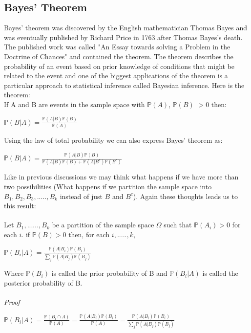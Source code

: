 \documentclass[,oneside]{article}
\begin{document}
\begin{enumerate}
\subsection{Bayes' Theorem}
Bayes' theorem was discovered by the English mathematician Thomas Bayes and was eventually published by Richard Price in 1763 after Thomas Bayes's death. The published work was called "An Essay towards solving a Problem in the Doctrine of Chances" and contained the theorem. The theorem describes the probability of an event based on prior knowledge of conditions that might be related to the event and one of the biggest applications of the theorem is a particular approach to statistical inference called Bayesian inference. Here is the theorem:\\
If A and B are events in the sample space with $\mathbb{P}(A)$, $\mathbb{P}(B)$ $> 0$ then:\\
\begin{center}
$\mathbb{P}(B|A)=\frac{\mathbb{P}(A|B)\mathbb{P}(B)}{\mathbb{P}(A)}$
\end{center}
Using the law of total probability we can also express Bayes' theorem as:
\begin{center}
$\mathbb{P}(B|A)=\frac{\mathbb{P}(A|B)\mathbb{P}(B)}{\mathbb{P}(A|B)\mathbb{P}(B)+\mathbb{P}(A|B^c)\mathbb{P}(B^c)}$
\end{center}
Like in previous discussions we may think what happens if we have more than two possibilities (What happens if we partition the sample space into $B_1, B_2, B_3,.....,B_k$ instead of just $B$ and $B^c$). Again these thoughts leads us to this result:\\
\\Let $B_1,......,B_k$ be a partition of the sample space $\Omega$ such that $\mathbb{P}(A_i) > 0$ for each $i$. if $\mathbb{P}(B) > 0$ then, for each $i,.....,k$,
\begin{center}
$\mathbb{P}(B_i|A)=\frac{\mathbb{P}(A|B_i)\mathbb{P}(B_i)}{\sum_j \mathbb{P}(A|B_j)\mathbb{P}(B_j)}$
\end{center}
Where $\mathbb{P}(B_i)$ is called the prior probability of B and $\mathbb{P}(B_i|A)$ is called the posterior probability of B.\\
\\ \textit{Proof}
\begin{center}
$\mathbb{P}(B_i|A)=\frac{\mathbb{P}(B_i\cap A)}{\mathbb{P}(A)}=\frac{\mathbb{P}(A|B_i)\mathbb{P}(B_i)}{\mathbb{P}(A)}=\frac{\mathbb{P}(A|B_i)\mathbb{P}(B_i)}{\sum_j \mathbb{P}(A|B_j)\mathbb{P}(B_j)}$
\end{center}

\end{enumerate}
\end{document}
